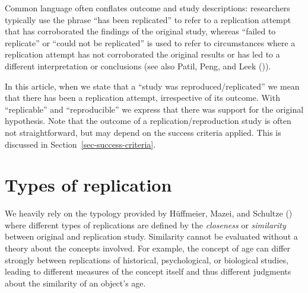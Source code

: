 \documentclass[
  letterpaper,
  DIV=11,
  openany,
  fontsize=12pt,
  parskip=half,
  headings=big,
  numbers=noenddot,
  titlepage=false]{scrreprt}
\begin{document}
Common language often conflates outcome and study descriptions:
researchers typically use the phrase ``has been replicated'' to refer to
a replication attempt that has corroborated the findings of the original
study, whereas ``failed to replicate'' or ``could not be replicated'' is
used to refer to circumstances where a replication attempt has not
corroborated the original results or has led to a different
interpretation or conclusions (see also Patil, Peng, and Leek
()).

In this article, when we state that a ``study was
reproduced/replicated'' we mean that there has been a replication
attempt, irrespective of its outcome. With ``replicable'' and
``reproducible'' we express that there was support for the original
hypothesis. Note that the outcome of a replication/reproduction study is
often not straightforward, but may depend on the success criteria
applied. This is discussed in Section~\ref{sec-success-criteria}.

\section{Types of replication}\label{types-of-replication}

We heavily rely on the typology provided by Hüffmeier, Mazei, and
Schultze () where different types
of replications are defined by the \emph{closeness} or \emph{similarity}
between original and replication study. Similarity cannot be evaluated
without a theory about the concepts involved. For example, the concept
of age can differ strongly between replications of historical,
psychological, or biological studies, leading to different measures of
the concept itself and thus different judgments about the similarity of
an object's age.
\end{document}
